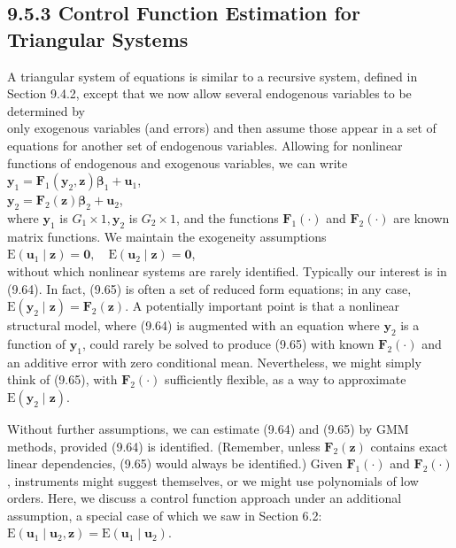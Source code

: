\documentclass[10pt]{article}
\begin{document}
\subsection*{9.5.3 Control Function Estimation for Triangular Systems}
A triangular system of equations is similar to a recursive system, defined in Section 9.4.2, except that we now allow several endogenous variables to be determined by\\
only exogenous variables (and errors) and then assume those appear in a set of equations for another set of endogenous variables. Allowing for nonlinear functions of endogenous and exogenous variables, we can write\\
$\mathbf{y}_{1}=\mathbf{F}_{1}\left(\mathbf{y}_{2}, \mathbf{z}\right) \boldsymbol{\beta}_{1}+\mathbf{u}_{1}$,\\
$\mathbf{y}_{2}=\mathbf{F}_{2}(\mathbf{z}) \boldsymbol{\beta}_{2}+\mathbf{u}_{2}$,\\
where $\mathbf{y}_{1}$ is $G_{1} \times 1, \mathbf{y}_{2}$ is $G_{2} \times 1$, and the functions $\mathbf{F}_{1}(\cdot)$ and $\mathbf{F}_{2}(\cdot)$ are known matrix functions. We maintain the exogeneity assumptions\\
$\mathrm{E}\left(\mathbf{u}_{1} \mid \mathbf{z}\right)=\mathbf{0}, \quad \mathrm{E}\left(\mathbf{u}_{2} \mid \mathbf{z}\right)=\mathbf{0}$,\\
without which nonlinear systems are rarely identified. Typically our interest is in (9.64). In fact, (9.65) is often a set of reduced form equations; in any case, $\mathrm{E}\left(\mathbf{y}_{2} \mid \mathbf{z}\right)=\mathbf{F}_{2}(\mathbf{z})$. A potentially important point is that a nonlinear structural model, where (9.64) is augmented with an equation where $\mathbf{y}_{2}$ is a function of $\mathbf{y}_{1}$, could rarely be solved to produce (9.65) with known $\mathbf{F}_{2}(\cdot)$ and an additive error with zero conditional mean. Nevertheless, we might simply think of (9.65), with $\mathbf{F}_{2}(\cdot)$ sufficiently flexible, as a way to approximate $\mathrm{E}\left(\mathbf{y}_{2} \mid \mathbf{z}\right)$.

Without further assumptions, we can estimate (9.64) and (9.65) by GMM methods, provided (9.64) is identified. (Remember, unless $\mathbf{F}_{2}(\mathbf{z})$ contains exact linear dependencies, (9.65) would always be identified.) Given $\mathbf{F}_{1}(\cdot)$ and $\mathbf{F}_{2}(\cdot)$, instruments might suggest themselves, or we might use polynomials of low orders. Here, we discuss a control function approach under an additional assumption, a special case of which we saw in Section 6.2:\\
$\mathrm{E}\left(\mathbf{u}_{1} \mid \mathbf{u}_{2}, \mathbf{z}\right)=\mathrm{E}\left(\mathbf{u}_{1} \mid \mathbf{u}_{2}\right)$.
\end{document}
